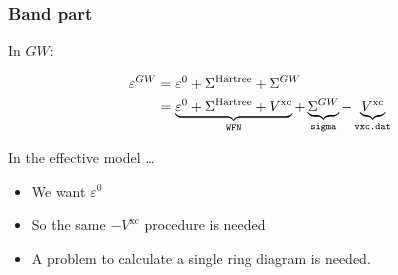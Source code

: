 \documentclass{beamer}
\newcommand{\shortcode}[1]{\texttt{#1}}
\begin{document}
\begin{frame}
\frametitle{Band part}

In $GW$:

\begin{equation}
    \begin{aligned}
        \varepsilon^{GW} &= \varepsilon^0 + \Sigma^{\text{Hartree}} + \Sigma^{GW} \\
        &= \underbrace{\varepsilon^0 + \Sigma^{\text{Hartree}} + V^{\text{xc}}}_{\text{\shortcode{WFN}}} 
        + \underbrace{\Sigma^{GW}}_{\text{\shortcode{sigma}}} 
        - \underbrace{V^{\text{xc}}}_{\text{\shortcode{vxc.dat}}}
    \end{aligned}
\end{equation}

In the effective model \dots
\begin{itemize}
    \item We want $\varepsilon^0$ 
    \item So the same $-V^{\text{xc}}$ procedure is needed
    \item A problem to calculate a single ring diagram is needed.
\end{itemize}

\end{frame}
\end{document}
